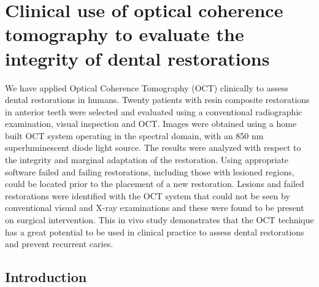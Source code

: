 \documentclass[12pt,twoside,english]{book}
\renewcommand{\~}{\perispomeni}%
\numberwithin{equation}{section}
\numberwithin{figure}{section}
\begin{document}
\section[Clinical use of OCT to evaluate integrity of dental restorations]{Clinical use of optical coherence tomography to evaluate the integrity of dental restorations}

We have applied Optical Coherence Tomography (OCT) clinically to assess dental restorations in humans. Twenty patients with resin composite restorations in anterior teeth were selected and evaluated using a conventional radiographic examination, visual inspection and OCT. Images were obtained using a home built OCT system operating in the spectral domain, with an 850 nm superluminescent diode light source. The results were analyzed with respect to the integrity and marginal adaptation of the restoration. Using appropriate software failed and failing restorations, including those with lesioned regions, could be located prior to the placement of a new restoration. Lesions and failed restorations were identified with the OCT system that could not be seen by conventional visual and X-ray examinations and these were found to be present on surgical intervention. This in vivo study demonstrates that the OCT technique has a great potential to be used in clinical practice to assess dental restorations and prevent recurrent caries. 

\subsection{Introduction}

\end{document}
